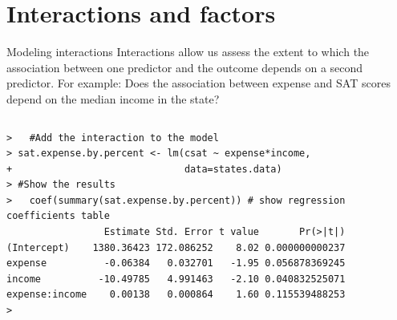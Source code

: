 \documentclass[table,smaller]{beamer}
\begin{document}
\section{Interactions and factors}
\label{sec-3}

\begin{frame}[fragile,label=sec-3-1]{Modeling interactions}
 Interactions allow us assess the extent to which the association between one predictor and the outcome depends on a second predictor. For example: Does the association between expense and SAT scores depend on the median income in the state?
\vspace{-.5em}
\begin{columns}
\begin{block}{}
\begin{verbatim}
>   #Add the interaction to the model
> sat.expense.by.percent <- lm(csat ~ expense*income,
+                              data=states.data) 
> #Show the results
>   coef(summary(sat.expense.by.percent)) # show regression coefficients table
                 Estimate Std. Error t value       Pr(>|t|)
(Intercept)    1380.36423 172.086252    8.02 0.000000000237
expense          -0.06384   0.032701   -1.95 0.056878369245
income          -10.49785   4.991463   -2.10 0.040832525071
expense:income    0.00138   0.000864    1.60 0.115539488253
>
\end{verbatim}
\end{block}
\end{columns}
\vspace{.5em}
\end{frame}
\end{document}
